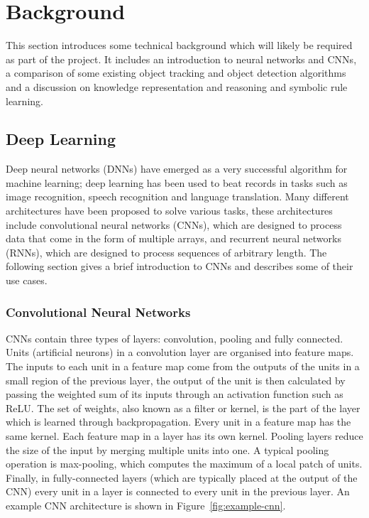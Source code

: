 \documentclass[../interim.tex]{subfiles}
\begin{document}
\section{Background}

This section introduces some technical background which will likely be required as part of the project. It includes an introduction to neural networks and CNNs, a comparison of some existing object tracking and object detection algorithms and a discussion on knowledge representation and reasoning and symbolic rule learning.

\subsection{Deep Learning}

Deep neural networks (DNNs) have emerged as a very successful algorithm for machine learning; deep learning has been used to beat records in tasks such as image recognition, speech recognition and language translation\cite{deep-learning-intro}. Many different architectures have been proposed to solve various tasks, these architectures include convolutional neural networks (CNNs), which are designed to process data that come in the form of multiple arrays\cite{deep-learning-intro}, and recurrent neural networks (RNNs), which are designed to process sequences of arbitrary length\cite{def:rnn}. The following section gives a brief introduction to CNNs and describes some of their use cases.

\subsubsection{Convolutional Neural Networks}

CNNs contain three types of layers: convolution, pooling and fully connected. Units (artificial neurons) in a convolution layer are organised into feature maps. The inputs to each unit in a feature map come from the outputs of the units in a small region of the previous layer, the output of the unit is then calculated by passing the weighted sum of its inputs through an activation function such as ReLU. The set of weights, also known as a filter or kernel, is the part of the layer which is learned through backpropagation. Every unit in a feature map has the same kernel. Each feature map in a layer has its own kernel. Pooling layers reduce the size of the input by merging multiple units into one. A typical pooling operation is max-pooling, which computes the maximum of a local patch of units. Finally, in fully-connected layers (which are typically placed at the output of the CNN) every unit in a layer is connected to every unit in the previous layer. An example CNN architecture is shown in Figure~\ref{fig:example-cnn}.
\end{document}
